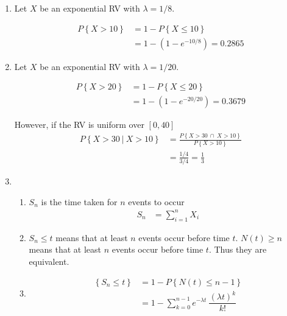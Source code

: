 \begin{enumerate}
\begin{enumerate}
		\end{enumerate}
	
	
	\item Let $ X $ be an exponential RV with $ \lambda = 1/8 $.
			
		\begin{align}
			P \left\{X > 10\right\} &= 1 - P \left\{X \leq 10 \right\} \nonumber \\
			&= 1 - (1 - e^{-10/8}) = 0.2865
		\end{align}
	
	
	\item Let $ X $ be an exponential RV with $ \lambda = 1/20 $.
			
		\begin{align}
			P \left\{X > 20\right\} &= 1 - P \left\{X \leq 20 \right\} \nonumber \\
			&= 1 - (1 - e^{-20/20}) = 0.3679
		\end{align}
		
		However, if the RV is uniform over $ [0, 40] $\\
		
		\begin{align}
			P \left\{X > 30\ |\ X > 10\right\} &= \frac{P \left\{X > 30 \ \cap\  X > 10\right\}}{P \left\{X > 10\right\}} \nonumber \\
			&= \frac{1/4}{3/4} = \frac{1}{3}
		\end{align}
	
	
	\item 
			
		\begin{enumerate}
			\item $ S_n $ is the time taken for $ n $ events to occur
			\begin{align}
				S_n &= \sum\limits_{i=1}^{n} X_i
			\end{align}
			
			\item $ S_n \leq t $ means that at least $ n $ events occur before time $ t $.
			$ N(t) \geq n $ means that at least $ n $ events occur before time $ t $. Thus they are equivalent.
			
			\item 
			\begin{align}
				\left\{S_n \leq t\right\} &= 1 - P \left\{N(t) \leq n-1\right\} \nonumber \\
				&= 1 - \sum\limits_{k=0}^{n-1} e^{-\lambda t}\ \dfrac{(\lambda t)^k}{k!}
			\end{align}
			

\end{enumerate}
\end{enumerate}
